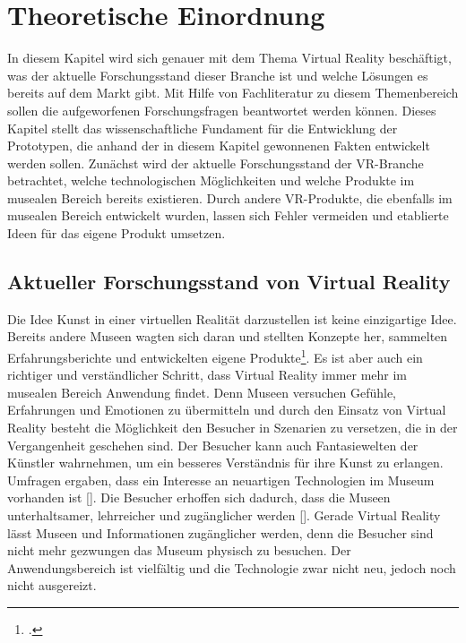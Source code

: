 \documentclass[a4paper,12pt,oneside]{article}
\begin{document}
      
  \section{Theoretische Einordnung}
    In diesem Kapitel wird sich genauer mit dem Thema Virtual Reality beschäftigt, was 
    der aktuelle Forschungsstand dieser Branche ist und welche Lösungen es bereits auf 
    dem Markt gibt. Mit Hilfe von Fachliteratur zu diesem Themenbereich sollen die
    aufgeworfenen Forschungsfragen beantwortet werden können. Dieses Kapitel stellt das
    wissenschaftliche Fundament für die Entwicklung der Prototypen, die anhand der in
    diesem Kapitel gewonnenen Fakten entwickelt werden sollen. Zunächst wird der aktuelle
    Forschungsstand der VR-Branche betrachtet, welche technologischen
    Möglichkeiten und welche Produkte im musealen Bereich bereits existieren.
    Durch andere VR-Produkte, die ebenfalls im musealen Bereich entwickelt wurden, lassen
    sich Fehler vermeiden und etablierte Ideen für das eigene Produkt umsetzen.
    \subsection{Aktueller Forschungsstand von Virtual Reality}
      Die Idee Kunst in einer virtuellen Realität darzustellen ist keine einzigartige Idee.
      Bereits andere Museen wagten sich daran und stellten Konzepte her, sammelten
      Erfahrungsberichte und entwickelten eigene Produkte\footcite{Heidsiek2019}. Es ist
      aber auch ein richtiger und verständlicher Schritt, dass Virtual Reality immer mehr
      im musealen Bereich Anwendung findet. Denn Museen versuchen Gefühle,
      Erfahrungen und Emotionen zu übermitteln und durch den Einsatz von Virtual Reality
      besteht die Möglichkeit den Besucher in Szenarien zu versetzen, die in der
      Vergangenheit geschehen sind. Der Besucher kann auch Fantasiewelten der Künstler
      wahrnehmen, um ein besseres Verständnis für ihre Kunst zu erlangen. Umfragen ergaben, 
      dass ein Interesse an neuartigen Technologien im Museum vorhanden ist [\cite[34]{Heidsiek2019}].
      Die Besucher erhoffen sich dadurch, dass die Museen unterhaltsamer, lehrreicher und
      zugänglicher werden [\cite[34]{Heidsiek2019}]. Gerade Virtual Reality lässt Museen
      und Informationen zugänglicher werden, denn die Besucher sind nicht mehr gezwungen 
      das Museum physisch zu besuchen. Der Anwendungsbereich ist vielfältig und die 
      Technologie zwar nicht neu, jedoch noch nicht ausgereizt. 
\end{document}
